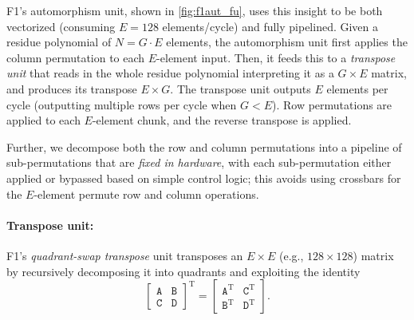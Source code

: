\figFOneautfu

F1's automorphism unit, shown in \autoref{fig:f1aut_fu}, uses this insight to be
both vectorized (consuming $E=128$ elements/cycle) and fully pipelined. Given a
residue polynomial of $N=G\cdot E$ elements, the automorphism unit first
applies the column permutation to each $E$-element input. Then, it feeds this
to a \emph{transpose unit} that reads in the whole residue polynomial
interpreting it as a $G\times E$ matrix, and produces its transpose $E\times
G$. The transpose unit outputs $E$ elements per cycle (outputting multiple rows
per cycle when $G < E$). Row permutations are applied to each $E$-element
chunk, and the reverse transpose is applied.

Further, we decompose both the row and column permutations into a pipeline of
sub-permutations that are \textit{fixed in hardware}, with each sub-permutation
either applied or bypassed based on simple control logic; this avoids using
crossbars for the $E$-element permute row and column operations.

\figFOneQuadrantSwap

\paragraph{Transpose unit:}
F1's \textit{quadrant-swap transpose} unit transposes an $E \times E$ (e.g.,
$128\times 128$) matrix by recursively decomposing it into quadrants and
exploiting the identity
\begin{equation*}
  \left[ \begin{array}{c|c}
      \texttt{A} & \texttt{B}\\
      \hline
      \texttt{C} & \texttt{D}
  \end{array}\right]^{\textrm{T}} =   \left[ \begin{array}{c|c}
      \texttt{A}^{\textrm{T}} & \texttt{C}^{\textrm{T}} \\
      \hline
      \texttt{B}^{\textrm{T}} & \texttt{D}^{\textrm{T}}
  \end{array}\right].
\end{equation*}

